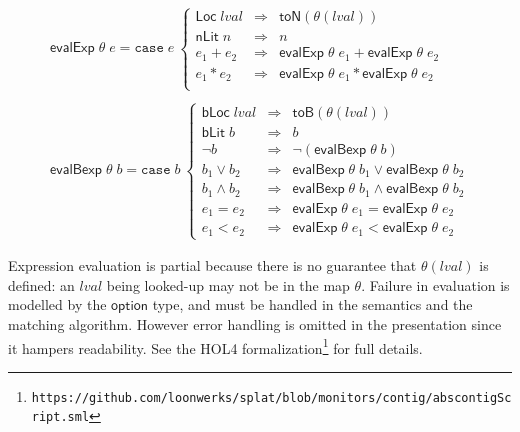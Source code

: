 \documentclass[a4paper,UKenglish,cleveref, autoref, thm-restate]{lipics-v2021}
\newcommand{\konst}[1]{\ensuremath{\mathsf{#1}}}
\newcommand{\lval}{\ensuremath{\mathit{lval}}}
\begin{document}
\[
\begin{array}{l}
\konst{evalExp} \;\theta \; e =
\mathtt{case}\; e\
 \left\{
 \begin{array}{lcl}
    \konst{Loc}\; \lval & \Rightarrow & \konst{toN}(\theta(\lval)) \\
    \konst{nLit}\; n & \Rightarrow & n  \\
    e_1 + e_2 & \Rightarrow & \konst{evalExp}\;\theta\; e_1 + \konst{evalExp}\;\theta\; e_2  \\
    e_1 * e_2 & \Rightarrow & \konst{evalExp}\;\theta\; e_1 * \konst{evalExp}\;\theta\; e_2  \\
  \end{array}
 \right.
 \\ \\
\konst{evalBexp}\;\theta \; b =
\mathtt{case}\; b\
 \left\{
 \begin{array}{lcl}
    \konst{bLoc}\; \lval & \Rightarrow & \konst{toB}(\theta(\lval)) \\
    \konst{bLit}\; b & \Rightarrow & b \\
    \neg b & \Rightarrow & \neg(\konst{evalBexp}\;\theta \; b)  \\
    b_1 \lor b_2 & \Rightarrow & \konst{evalBexp}\;\theta \;b_1 \lor \konst{evalBexp}\;\theta \;b_2   \\
    b_1 \land b_2 & \Rightarrow & \konst{evalBexp}\;\theta \;b_1 \land \konst{evalBexp}\;\theta \;b_2   \\
    e_1 = e_2 & \Rightarrow & \konst{evalExp}\;\theta \;e_1 = \konst{evalExp}\;\theta \;e_2   \\
    e_1 < e_2 & \Rightarrow & \konst{evalExp}\;\theta \;e_1 < \konst{evalExp}\;\theta \;e_2
  \end{array}
 \right.

\end{array}
\]

\begin{remark}[Partiality]
Expression evaluation is partial because there is no guarantee that
$\theta(\lval)$ is defined: an \lval{} being looked-up may not be in the
map $\theta$. Failure in evaluation is modelled by the \konst{option}
type, and must be handled in the semantics and the matching
algorithm. However error handling is omitted in the presentation since
it hampers readability. See the HOL4 formalization\footnote{
\texttt{https://github.com/loonwerks/splat/blob/monitors/contig/abscontigScript.sml}}
for full details.
\end{remark}
\end{document}
